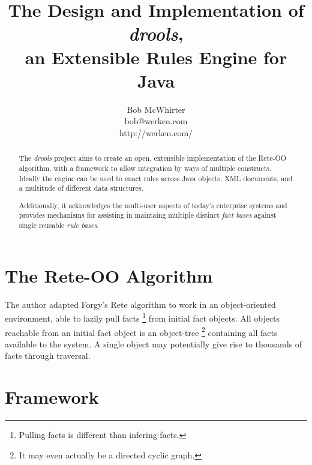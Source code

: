 \documentclass[10pt,letterpaper]{article}
\begin{document}




\title{The Design and Implementation of \emph{drools},\\an Extensible Rules
Engine for Java}

\author{Bob McWhirter\\bob@werken.com\\http://werken.com/}
\maketitle


\begin{abstract}
The \emph{drools} project aims to create an open, extensible
implementation of the Rete-OO algorithm, with a framework to
allow integration by ways of multiple constructs.  Ideally the 
engine can be used to enact rules across Java objects, XML
documents, and a multitude of different data structures.

Additionally, it acknowledges the multi-user aspects of today's
enterprise systems and provides mechanisms for assisting in
maintaing multiple distinct \emph{fact bases} against single 
reusable \emph{rule bases}.
\end{abstract}

\section{The Rete-OO Algorithm}

The author adapted Forgy's Rete algorithm\cite{forgy82rete} to work in an
object-oriented environment\cite{mcw01reteoo}, able to lazily pull facts%
	\footnote{Pulling facts is different than infering facts.} 
from initial fact objects. All objects reachable from an
initial fact object is an object-tree%
	\footnote{It may even actually be a directed cyclic graph.}
containing all facts available to the system.  A single object
may potentially give rise to thousands of facts through traversal.

\section{Framework}
\end{document}
